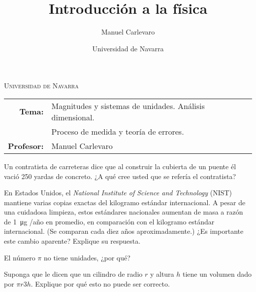 \documentclass[11pt]{article}
\title{Introducción a la física}
\author{Manuel Carlevaro}
\date{Universidad de Navarra}
\begin{document}

\begin{center}
\end{center} 

\begin{center}
\vspace{1em}
\Large{\textsc{Universidad de Navarra}} 
\end{center}

 \vspace{1em}

\begin{center}
\begin{tabular}{r l}
 \textbf{Tema:} & Magnitudes y sistemas de unidades. Análisis dimensional. \\
                & Proceso de medida y teoría de errores. \\
 \textbf{Profesor:} & Manuel Carlevaro \\
\end{tabular}\end{center}

\vspace{2em}

\begin{pregunta}
    Un contratista de carreteras dice que al construir la cubierta de un puente él vació \num{250} yardas de concreto. ¿A qué cree usted que se refería el contratista?
\end{pregunta}

\begin{pregunta}
    En Estados Unidos, el \textit{National Institute of Science and Technology} (NIST) mantiene varias copias exactas del kilogramo estándar internacional. A pesar de una cuidadosa limpieza, estos estándares nacionales aumentan de masa a razón de \qty{1}{\ug} /año en promedio, en comparación con el kilogramo estándar internacional. (Se comparan cada diez años aproximadamente.) ¿Es importante este cambio aparente? Explique su respuesta.
\end{pregunta}

\begin{pregunta}
El número $\pi$ no tiene unidades, ¿por qué?
\end{pregunta}

\begin{pregunta}
 Suponga que le dicen que un cilindro de radio $r$ y altura $h$ tiene un volumen dado por $\pi r 3 h$. Explique por qué esto no puede ser correcto.
\end{pregunta}
\end{document}
